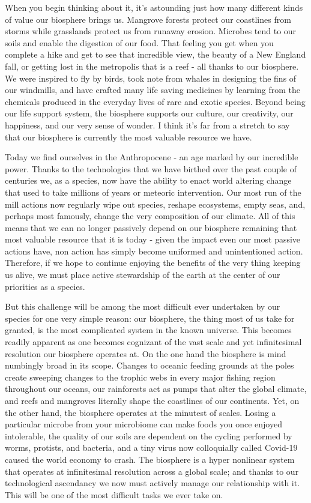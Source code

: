 \documentclass[10pt,a5paper]{book}
\begin{document}
When you begin thinking about it, it’s astounding just how many different kinds of value our biosphere brings us. Mangrove forests protect our coastlines from storms while grasslands protect us from runaway erosion. Microbes tend to our soils and enable the digestion of our food. That feeling you get when you complete a hike and get to see that incredible view, the beauty of a New England fall, or getting lost in the metropolis that is a reef - all thanks to our biosphere. We were inspired to fly by birds, took note from whales in designing the fins of our windmills, and have crafted many life saving medicines by learning from the chemicals produced in the everyday lives of rare and exotic species. Beyond being our life support system, the biosphere supports our culture, our creativity, our happiness, and our very sense of wonder. I think it’s far from a stretch to say that our biosphere is currently the most valuable resource we have. 

Today we find ourselves in the Anthropocene - an age marked by our incredible power. Thanks to the technologies that we have birthed over the past couple of centuries we, as a species, now have the ability to enact world altering change that used to take millions of years or meteoric intervention. Our most run of the mill actions now regularly wipe out species, reshape ecosystems, empty seas, and, perhaps most famously, change the very composition of our climate. All of this means that we can no longer passively depend on our biosphere remaining that most valuable resource that it is today - given the impact even our most passive actions have, non action has simply become uniformed and unintentioned action. Therefore, if we hope to continue enjoying the benefits of the very thing keeping us alive, we must place active stewardship of the earth at the center of our priorities as a species. 

But this challenge will be among the most difficult ever undertaken by our species for one very simple reason: our biosphere, the thing most of us take for granted, is the most complicated system in the known universe. This becomes readily apparent as one becomes cognizant of the vast scale and yet infinitesimal resolution our biosphere operates at. On the one hand the biosphere is mind numbingly broad in its scope. Changes to oceanic feeding grounds at the poles create sweeping changes to the trophic webs in every major fishing region throughout our oceans, our rainforests act as pumps that alter the global climate, and reefs and mangroves literally shape the coastlines of our continents. Yet, on the other hand, the biosphere operates at the minutest of scales. Losing a particular microbe from your microbiome can make foods you once enjoyed intolerable, the quality of our soils are dependent on the cycling performed by worms, protists, and bacteria, and a tiny virus now colloquially called Covid-19 caused the world economy to crash. The biosphere is a hyper nonlinear system that operates at infinitesimal resolution across a global scale; and thanks to our technological ascendancy we now must actively manage our relationship with it. This will be one of the most difficult tasks we ever take on. 
\end{document}
